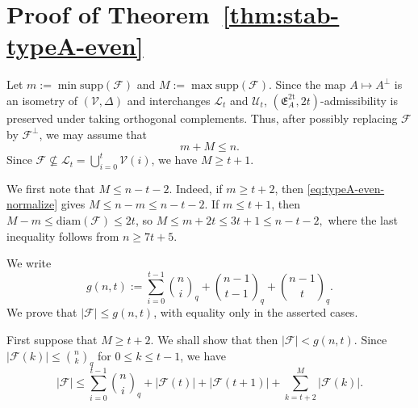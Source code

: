 \documentclass[11pt]{article}
\theoremstyle{definition}
\newcommand{\qbinom}[2]{\genfrac{(}{)}{0pt}{}{#1}{#2}_q}
\newcommand{\diam}{\mathrm{diam}}
\newcommand{\supp}{\mathrm{supp}}
\begin{document}
\section{Proof of Theorem~\ref{thm:stab-typeA-even}}\label{sec:stab-even-A}
Let $m:=\min\supp(\mathcal F)$ and $M:=\max\supp(\mathcal F)$. 
Since the map $A\mapsto A^\perp$ is an isometry of $(\mathcal V,\Delta)$ and interchanges $\mathcal L_t$ and $\mathcal U_t$, $(\mathfrak E_A^{\mathrm{2t}},2t)$-admissibility is preserved under taking orthogonal complements. 
Thus, after possibly replacing $\mathcal F$ by $\mathcal F^\perp$, we may assume that
\begin{equation}\label{eq:typeA-even-normalize}
m+M\le n.
\end{equation}
Since $\mathcal F\not\subseteq \mathcal L_t=\bigcup_{i=0}^{t}\mathcal V(i)$, we have $M\ge t+1$.

We first note that
\(
M\le n-t-2.
\)
Indeed, if $m\ge t+2$, then \eqref{eq:typeA-even-normalize} gives $M\le n-m\le n-t-2$. 
If $m\le t+1$, then $M-m\le \diam(\mathcal F)\le 2t$, so
\(
M\le m+2t\le 3t+1\le n-t-2,
\)
where the last inequality follows from $n\ge 7t+5$.

We write
\[
g(n,t):=\sum_{i=0}^{t-1}\qbinom{n}{i}+\qbinom{n-1}{t-1}+\qbinom{n-1}{t}.
\]
We prove that $|\mathcal F|\le g(n,t)$, with equality only in the asserted cases.

First suppose that $M\ge t+2$. 
We shall show that then $|\mathcal F|<g(n,t)$. 
Since $|\mathcal F(k)|\le \qbinom{n}{k}$ for $0\le k\le t-1$, we have
\[
|\mathcal F|
\le
\sum_{i=0}^{t-1}\qbinom{n}{i}
+
|\mathcal F(t)|+|\mathcal F(t+1)|
+
\sum_{k=t+2}^{M}|\mathcal F(k)|.
\]
\end{document}
